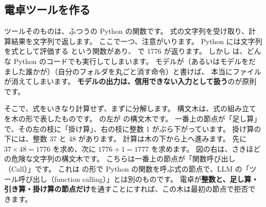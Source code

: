 \subsection{電卓ツールを作る}

ツールそのものは、ふつうの Python の関数です。
式の文字列を受け取り、計算結果を文字列で返します。
ここで一つ、注意がいります。
Python には文字列を式として評価する  という関数があり、 で 1776 が返ります。
しかし  は、どんな Python のコードでも実行してしまいます。
モデルが（あるいはモデルをだました誰かが）（自分のフォルダを丸ごと消す命令）と書けば、
本当にファイルが消えてしまいます。
\textbf{モデルの出力は、信用できない入力として扱う}のが原則です。

そこで、式をいきなり計算せず、まずに分解します。
構文木は、式の組み立てを木の形で表したものです。
の左が  の構文木です。
一番上の節点が「足し算」で、その左の枝に「掛け算」、右の枝に整数 1 がぶら下がっています。
掛け算の下には、整数 37 と 48 があります。
計算は木の下から上へ進みます。
先に $37\times48=1776$ を求め、次に $1776+1=1777$ を求めます。
図の右は、さきほどの危険な文字列の構文木です。
こちらは一番上の節点が「関数呼び出し（Call）」です。
これは  の形で Python の関数を呼ぶ式の節点で、LLM の「ツール呼び出し（function calling）」とは別のものです。
電卓が\textbf{整数と、足し算・引き算・掛け算の節点だけ}を通すことにすれば、この木は最初の節点で拒否できます。

